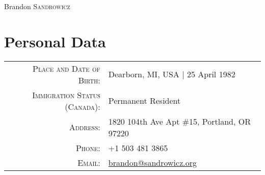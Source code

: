 \documentclass[a4paper,10pt]{article}
\begin{document}
\pagestyle{empty} %

\par{\centering
{\Huge Brandon \textsc{Sandrowicz} }
\bigskip\par}

\section{Personal Data}
\begin{tabular}{rl}
\textsc{Place and Date of Birth:}       & Dearborn, MI, USA | 25 April 1982\\
\textsc{Immigration Status (Canada):}   & Permanent Resident\\
\textsc{Address:}                       & 1820 104th Ave Apt \#15, Portland, OR 97220\\
\textsc{Phone:}                         & +1 503 481 3865\\
\textsc{Email:}                         & \href{mailto:brandon@sandrowicz.org}{brandon@sandrowicz.org}\\
\end{tabular}

\end{document}
